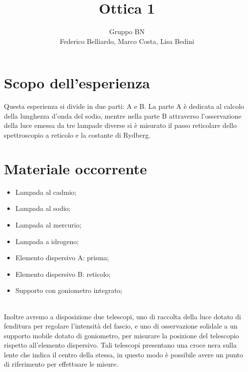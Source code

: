\documentclass[10pt,a4paper]{article}
\author{Gruppo BN \\ Federico Belliardo, Marco Costa, Lisa Bedini}
\title{Ottica 1}
\begin{document}
\maketitle
\section{Scopo dell'esperienza}
Questa esperienza si divide in due parti: A e B.
La parte A è dedicata al calcolo della lunghezza d'onda del sodio, mentre nella parte B attraverso l'osservazione della luce emessa da tre lampade diverse si è misurato il passo reticolare dello spettroscopio a reticolo e la costante di Rydberg.

\section{Materiale occorrente}
\begin{itemize}
\item Lampada al cadmio;
\item Lampada al sodio;
\item Lampada al mercurio;
\item Lampada a idrogeno;
\item Elemento dispersivo A: prisma;
\item Elemento dispersivo B: reticolo;
\item Supporto con goniometro integrato;
\end{itemize}
\\
Inoltre avremo a disposizione due telescopi, uno di raccolta della luce dotato di fenditura per regolare l'intensità del fascio, e uno di osservazione solidale a un supporto mobile dotato di goniometro, per misurare la posizione del telescopio rispetto all'elemento dispersivo. Tali telescopi presentano una croce nera sulla lente che indica il centro della stessa, in questo modo è possibile avere un punto di riferimento per effettuare le misure.
\end{document}
